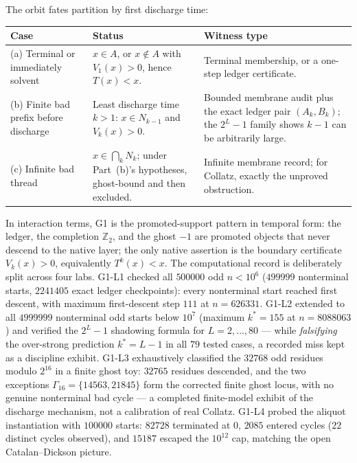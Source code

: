 \documentclass[11pt]{article}
\theoremstyle{definition}
\begin{document}
The orbit fates partition by first discharge time:

\begin{center}
\footnotesize
\begin{tabularx}{\textwidth}{@{}lXX@{}}
\toprule
Case & Status & Witness type \\
\midrule
(a) Terminal or immediately solvent & $x \in A$, or $x \notin A$ with $V_1(x) > 0$, hence
$T(x) < x$. & Terminal membership, or a one-step ledger certificate. \\
(b) Finite bad prefix before discharge & Least discharge time $k > 1$: $x \in N_{k-1}$ and
$V_k(x) > 0$. & Bounded membrane audit plus the exact ledger pair $(A_k, B_k)$; the $2^L - 1$ family
shows $k - 1$ can be arbitrarily large. \\
(c) Infinite bad thread & $x \in \bigcap_k N_k$; under Part~(b)'s hypotheses, ghost-bound and then
excluded. & Infinite membrane record; for Collatz, exactly the unproved obstruction. \\
\bottomrule
\end{tabularx}
\end{center}

In interaction terms, G1 is the promoted-support pattern in temporal form: the ledger, the completion
$\mathbb{Z}_2$, and the ghost $-1$ are promoted objects that never descend to the native layer; the
only native assertion is the boundary certificate $V_k(x) > 0$, equivalently $T^k(x) < x$. The
computational record is deliberately split across four labs. G1-L1 checked all $500000$ odd
$n < 10^{6}$ ($499999$ nonterminal starts, $2241405$ exact ledger checkpoints): every nonterminal
start reached first descent, with maximum first-descent step $111$ at $n = 626331$. G1-L2 extended to
all $4999999$ nonterminal odd starts below $10^{7}$ (maximum $k^{*} = 155$ at $n = 8088063$) and
verified the $2^{L}-1$ shadowing formula for $L = 2, \ldots, 80$ --- while \emph{falsifying} the
over-strong prediction $k^{*} = L - 1$ in all $79$ tested cases, a recorded miss kept as a discipline
exhibit. G1-L3 exhaustively classified the $32768$ odd residues modulo $2^{16}$ in a finite ghost toy:
$32765$ residues descended, and the two exceptions $\Gamma_{16} = \{14563, 21845\}$ form the corrected
finite ghost locus, with no genuine nonterminal bad cycle --- a completed finite-model exhibit of the
discharge mechanism, not a calibration of real Collatz. G1-L4 probed the aliquot instantiation with
$100000$ starts: $82728$ terminated at $0$, $2085$ entered cycles ($22$ distinct cycles observed), and
$15187$ escaped the $10^{12}$ cap, matching the open Catalan--Dickson picture.
\end{document}

